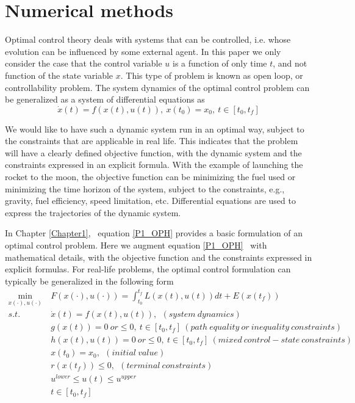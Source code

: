 \documentclass  [
  paper    = a4,
  BCOR     = 10mm,
  twoside,
  fontsize = 12pt,
  fleqn,
  toc      = bibnumbered,
  toc      = listofnumbered,
  numbers  = noendperiod,
  headings = normal,
  listof   = leveldown,
  version  = 3.03
]                                       {scrreprt}
\newcommand{\<}{\langle}
\renewcommand{\>}{\rangle}
\begin{document}
\chapter{Numerical methods}
\label{Chapter2}
Optimal control theory deals with systems that can be controlled, i.e. whose evolution can be influenced by some external agent. In this paper we only consider the case that the control variable $u$ is a function of only time $t$, and not function of the state variable $x$. This type of problem is known as open loop, or controllability problem. The system dynamics of the optimal control problem can be generalized as a system of differential equations as
\begin{equation}
	  \dot{x} (t) = f(x(t), u(t)), \ x(t_0) = x_0, \ t \in [t_0, t_f]
\end{equation}	  

We would like to have such a dynamic system run in an optimal way, subject to the constraints that are applicable in real life. This indicates that the problem will have a clearly defined objective function, with the dynamic system and the constraints expressed in an explicit formula. With the example of launching the rocket to the moon, the objective function can be minimizing the fuel used or minimizing the time horizon of the system, subject to the constraints, e.g., gravity, fuel efficiency, speed limitation, etc. Differential equations are used to express the trajectories of the dynamic system. 

In Chapter \ref{Chapter1},  equation \ref{P1_OPH} provides a basic formulation of an optimal control problem. Here we augment equation \ref{P1_OPH}  with mathematical details, with the objective function and the constraints expressed in explicit formulas. For real-life problems, the optimal control formulation can typically be generalized in the following form  
	\begin{subequations}
		\begin{align}
			\underset{x(\cdot), u(\cdot)}{\text{min}}   \ &  F(x(\cdot), u(\cdot))  = \int_{t_0}^{t_f}L(x(t), u(t))dt + E (x(t_f)) \label{P2_cost} \\
			s.t.\ \ &  \dot{x} (t) = f(x(t), u(t)), \ \ (system \ dynamics)   \label{P2_sd} \\
			& g(x(t)) = 0 \  or \leq 0, \ t \in [t_0, t_f]\  (path\  equality\ or\ inequality\ constraints)  \label{P2_ec}\\
			& h(x(t), u(t)) =0\  or  \leq 0,\ t \in [t_0, t_f] \ (mixed \ control-state  \ constraints)  \label{P2_inc}\\
			& x(t_0) = x_0, \ \ (initial \ value) \\
			& r(x(t_f)) \leq 0, \ \ (terminal \ constraints)  \label{P2_final} \\
			& u^{lower} \leq u(t) \leq u^{upper}   \label{P2_box_u} \\ 
			& t \in [t_0, t_f]
		\end{align}
		\label{P2_OPM}
	\end{subequations}  
\end{document}
